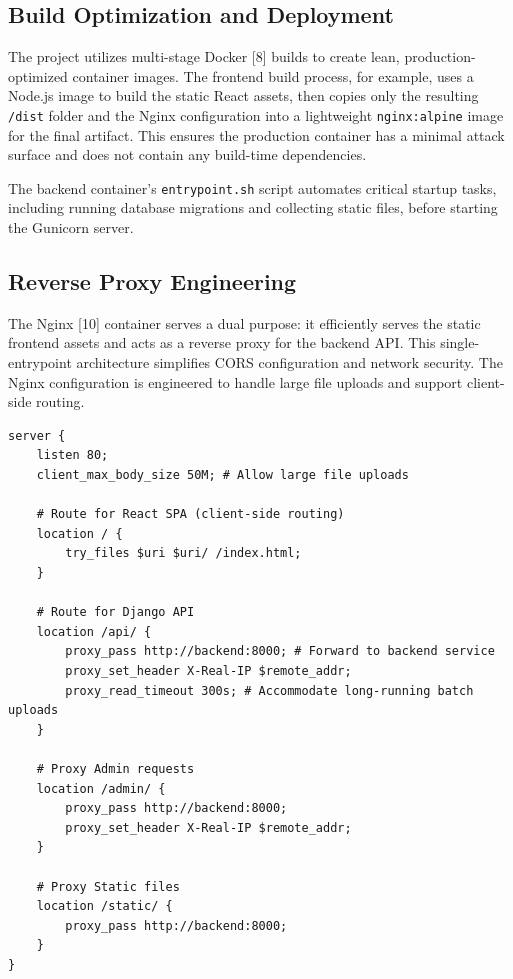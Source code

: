\subsection{Build Optimization and Deployment}

The project utilizes multi-stage Docker [8] builds to create lean, production-optimized container images. The frontend build process, for example, uses a Node.js image to build the static React assets, then copies only the resulting \texttt{/dist} folder and the Nginx configuration into a lightweight \texttt{nginx:alpine} image for the final artifact. This ensures the production container has a minimal attack surface and does not contain any build-time dependencies.

The backend container's \texttt{entrypoint.sh} script automates critical startup tasks, including running database migrations and collecting static files, before starting the Gunicorn server.

\subsection{Reverse Proxy Engineering}

The Nginx [10] container serves a dual purpose: it efficiently serves the static frontend assets and acts as a reverse proxy for the backend API. This single-entrypoint architecture simplifies CORS configuration and network security. The Nginx configuration is engineered to handle large file uploads and support client-side routing.

\begin{lstlisting}[float, language=nginx, caption=Nginx Reverse Proxy Configuration (\texttt{nginx.conf})]
server {
    listen 80;
    client_max_body_size 50M; # Allow large file uploads

    # Route for React SPA (client-side routing)
    location / {
        try_files $uri $uri/ /index.html;
    }

    # Route for Django API
    location /api/ {
        proxy_pass http://backend:8000; # Forward to backend service
        proxy_set_header X-Real-IP $remote_addr;
        proxy_read_timeout 300s; # Accommodate long-running batch uploads
    }

    # Proxy Admin requests
    location /admin/ {
        proxy_pass http://backend:8000;
        proxy_set_header X-Real-IP $remote_addr;
    }

    # Proxy Static files
    location /static/ {
        proxy_pass http://backend:8000;
    }
}
\end{lstlisting}